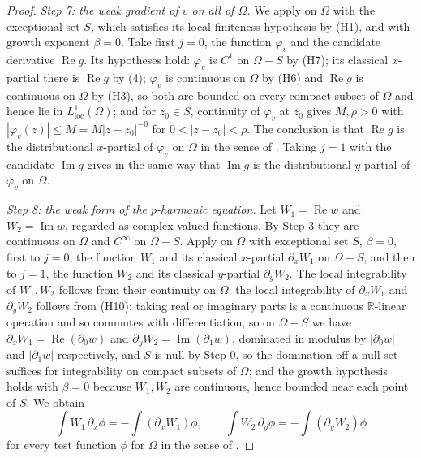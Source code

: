 \begin{proof}
\emph{Step 7: the weak gradient of $v$ on all of $\Omega$.}  We apply
 on $\Omega$ with the exceptional set $S$,
which satisfies its local finiteness hypothesis by (H1), and with growth
exponent $\beta=0$.  Take first $j=0$, the function $\varphi_v$ and the
candidate derivative $\operatorname{Re}g$.  Its hypotheses hold:
$\varphi_v$ is $C^1$ on $\Omega-S$ by (H7); its classical $x$-partial there is
$\operatorname{Re}g$ by (4); $\varphi_v$ is continuous on $\Omega$ by (H6) and
$\operatorname{Re}g$ is continuous on $\Omega$ by (H3), so both are bounded on
every compact subset of $\Omega$ and hence lie in
$L^1_{\mathrm{loc}}(\Omega)$; and for $z_0\in S$, continuity of $\varphi_v$ at
$z_0$ gives $M,\rho>0$ with $|\varphi_v(z)|\le M=M|z-z_0|^{-0}$ for
$0<|z-z_0|<\rho$.  The conclusion is that $\operatorname{Re}g$ is the
distributional $x$-partial of $\varphi_v$ on $\Omega$ in the sense of
.  Taking $j=1$ with the candidate
$\operatorname{Im}g$ gives in the same way that $\operatorname{Im}g$ is the
distributional $y$-partial of $\varphi_v$ on $\Omega$.

\emph{Step 8: the weak form of the $p$-harmonic equation.}  Let
$W_1=\operatorname{Re}w$ and $W_2=\operatorname{Im}w$, regarded as
complex-valued functions.  By Step 3 they are continuous on $\Omega$ and
$C^\infty$ on $\Omega-S$.  Apply  on $\Omega$
with exceptional set $S$, $\beta=0$, first to $j=0$, the function $W_1$ and its
classical $x$-partial $\partial_xW_1$ on $\Omega-S$, and then to $j=1$, the
function $W_2$ and its classical $y$-partial $\partial_yW_2$.  The local
integrability of $W_1,W_2$ follows from their continuity on $\Omega$; the local
integrability of $\partial_xW_1$ and $\partial_yW_2$ follows from (H10):
taking real or imaginary parts is a continuous $\mathbb{R}$-linear operation and
so commutes with differentiation, so on $\Omega-S$ we have
$\partial_xW_1=\operatorname{Re}(\partial_0w)$ and
$\partial_yW_2=\operatorname{Im}(\partial_1w)$, dominated in modulus by
$|\partial_0w|$ and $|\partial_1w|$ respectively, and $S$ is null by Step 0, so
the domination off a null set suffices for integrability on compact subsets of
$\Omega$; and the growth hypothesis
holds with $\beta=0$ because $W_1,W_2$ are continuous, hence bounded near each
point of $S$.  We obtain
\begin{equation}\tag{6}
  \int W_1\,\partial_x\phi=-\int(\partial_xW_1)\phi,\qquad
  \int W_2\,\partial_y\phi=-\int(\partial_yW_2)\phi
\end{equation}
for every test function $\phi$ for $\Omega$ in the sense of .


\end{proof}
